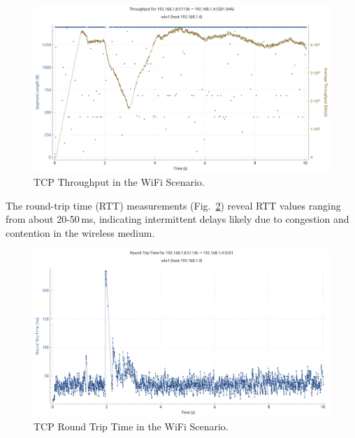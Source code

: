 \begin{enumerate}
                \begin{figure}[ht]
                    \centering
                    \includegraphics[width=0.9\columnwidth]{images/graphs/Throughput/Throughput_WiFi_TCP.pdf}
                    \caption{TCP Throughput in the WiFi Scenario.}
                    \label{fig:throughput-wifi-tcp}
                \end{figure}

                The round-trip time (RTT) measurements (Fig.~\ref{fig:rtt-wifi-tcp}) reveal RTT values ranging from about 20-50\,ms, indicating intermittent delays likely due to congestion and contention in the wireless medium.
                
                \begin{figure}[ht]
                    \centering
                    \includegraphics[width=0.9\columnwidth]{images/graphs/RTT/RTT_WiFi_TCP.pdf}
                    \caption{TCP Round Trip Time in the WiFi Scenario.}
                    \label{fig:rtt-wifi-tcp}
                \end{figure}    

                

\end{enumerate}
